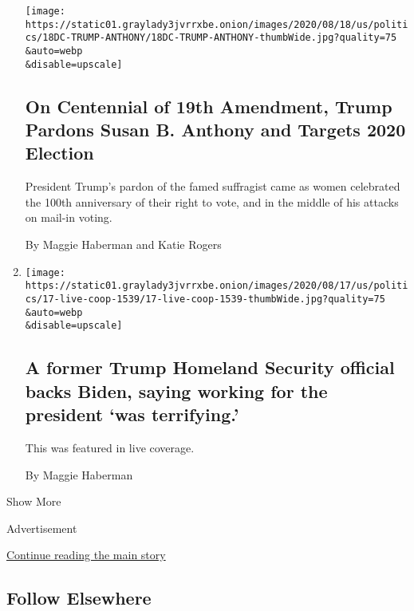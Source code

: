 \begin{enumerate}
  \texttt{[image: https://static01.graylady3jvrrxbe.onion/images/2020/08/18/us/politics/18DC-TRUMP-ANTHONY/18DC-TRUMP-ANTHONY-thumbWide.jpg?quality=75\\\&auto=webp\\\&disable=upscale]}

  \hypertarget{on-centennial-of-19th-amendment-trump-pardons-susan-b-anthony-and-targets-2020-election}{%
  \subsection{On Centennial of 19th Amendment, Trump Pardons Susan B.
  Anthony and Targets 2020
  Election}\label{on-centennial-of-19th-amendment-trump-pardons-susan-b-anthony-and-targets-2020-election}}

  President Trump's pardon of the famed suffragist came as women
  celebrated the 100th anniversary of their right to vote, and in the
  middle of his attacks on mail-in voting.

  By Maggie Haberman and Katie Rogers
\item
  \href{/live/2020/08/17/us/dnc-convention/a-former-trump-homeland-security-official-backs-biden-saying-working-for-the-president-was-terrifying}{}

  \texttt{[image: https://static01.graylady3jvrrxbe.onion/images/2020/08/17/us/politics/17-live-coop-1539/17-live-coop-1539-thumbWide.jpg?quality=75\\\&auto=webp\\\&disable=upscale]}

  \hypertarget{a-former-trump-homeland-security-official-backs-biden-saying-working-for-the-president-was-terrifying}{%
  \subsection{A former Trump Homeland Security official backs Biden,
  saying working for the president `was
  terrifying.'}\label{a-former-trump-homeland-security-official-backs-biden-saying-working-for-the-president-was-terrifying}}

  This was featured in live coverage.

  By Maggie Haberman
\end{enumerate}

Show More

Advertisement

\protect\hyperlink{after-mid2}{Continue reading the main story}

\hypertarget{follow-elsewhere}{%
\subsection{Follow Elsewhere}\label{follow-elsewhere}}

